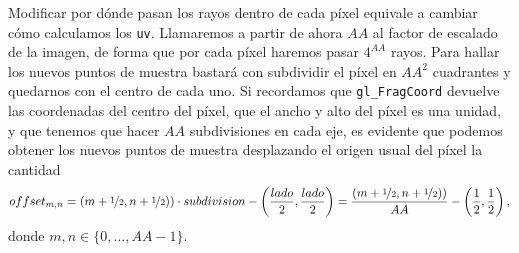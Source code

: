 Modificar por dónde pasan los rayos dentro de cada píxel equivale a cambiar cómo calculamos los \texttt{uv}. Llamaremos a partir de ahora $AA$ al factor de escalado de la imagen, de forma que por cada píxel haremos pasar $4^{AA}$ rayos. Para hallar los nuevos puntos de muestra bastará con subdividir el píxel en $AA^2$ cuadrantes y quedarnos con el centro de cada uno. Si recordamos que \texttt{gl\_FragCoord} devuelve las coordenadas del centro del píxel, que el ancho y alto del píxel es una unidad, y que tenemos que hacer $AA$ subdivisiones en cada eje, es evidente que podemos obtener los nuevos puntos de muestra desplazando el origen usual del píxel la cantidad
\begin{equation*}
    offset_{m,n} = (m+\nicefrac{1}{2},n+\nicefrac{1}{2}))\cdot subdivision - \left( \frac{lado}{2}, \frac{lado}{2}\right) = \frac{ (m+\nicefrac{1}{2},n+\nicefrac{1}{2}))}{AA} - \left( \frac{1}{2}, \frac{1}{2}\right),
\end{equation*}
donde $m,n\in \{0,\dots, AA-1\}$.\newline
